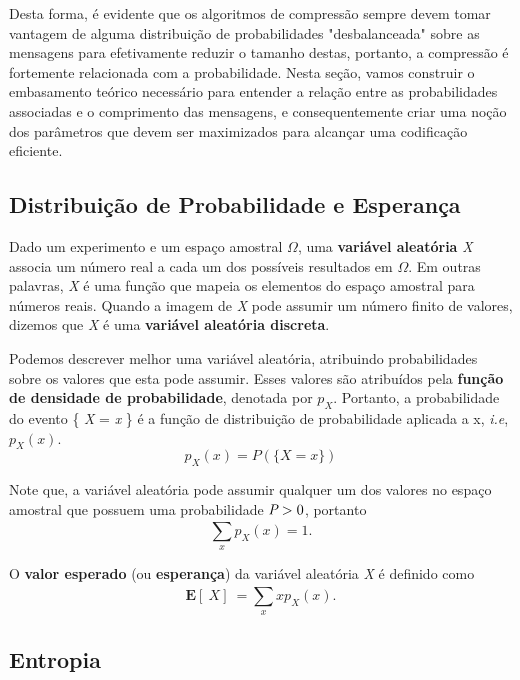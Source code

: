 Desta forma, é evidente que os algoritmos de compressão sempre devem tomar vantagem de alguma distribuição de probabilidades "desbalanceada" sobre as mensagens para efetivamente reduzir o tamanho destas, portanto, a compressão é fortemente relacionada com a probabilidade. Nesta seção, vamos construir o embasamento teórico necessário para entender a relação entre as probabilidades associadas e o comprimento das mensagens, e consequentemente criar uma noção dos parâmetros que devem ser maximizados para alcançar uma codificação eficiente.

\subsection{Distribuição de Probabilidade e Esperança}
Dado um experimento e um espaço amostral $\Omega$, uma \textbf{variável aleatória} \emph{X} associa um número real a cada um dos possíveis resultados em $\Omega$. Em outras palavras, \emph{X} é uma função que mapeia os elementos do espaço amostral para números reais. Quando a imagem de \emph{X} pode assumir um número finito de valores, dizemos que \emph{X} é uma \textbf{variável aleatória discreta}.

Podemos descrever melhor uma variável aleatória, atribuindo probabilidades sobre os valores que esta pode assumir. Esses valores são atribuídos pela \textbf{função de densidade de probabilidade}, denotada por \emph{$p_X$}. Portanto, a probabilidade do evento \{ \emph{X} = \emph{x} \} é a função de distribuição de probabilidade aplicada a x, \emph{i.e}, \emph{$p_X(x)$}.
\begin{equation*}
p_X(x) = P(\{X = x\})
\end{equation*}

Note que, a variável aleatória pode assumir qualquer um dos valores no espaço amostral que possuem uma probabilidade $\emph{P} > 0$, portanto
\begin{equation*}
\sum_{x}^{}p_X(x) = 1.
\end{equation*}

O \textbf{valor esperado} (ou \textbf{esperança}) da variável aleatória \emph{X} é definido como
\begin{equation*}
\textbf{E}[\ X]\ = \sum_{x}^{} xp_X(x).
\end{equation*}

\subsection{Entropia}


